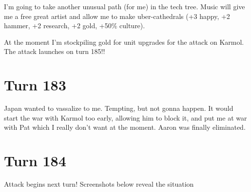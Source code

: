 \documentclass[10pt]{article}
\begin{document}
I'm going to take another unusual path (for me) in the tech
tree. Music will give me a free great artist and allow me to make
uber-cathedrals (+3 happy, +2 hammer, +2 research, +2 gold, +50\%
culture).

At the moment I'm stockpiling gold for unit upgrades for the attack on
Karmol. The attack launches on turn 185!!

\section*{Turn 183}

Japan wanted to vassalize to me. Tempting, but not gonna happen. It
would start the war with Karmol too early, allowing him to block it,
and put me at war with Pat which I really don't want at the
moment. Aaron was finally eliminated.

\section*{Turn 184}

Attack begins next turn! Screenshots below reveal the situation
\end{document}
